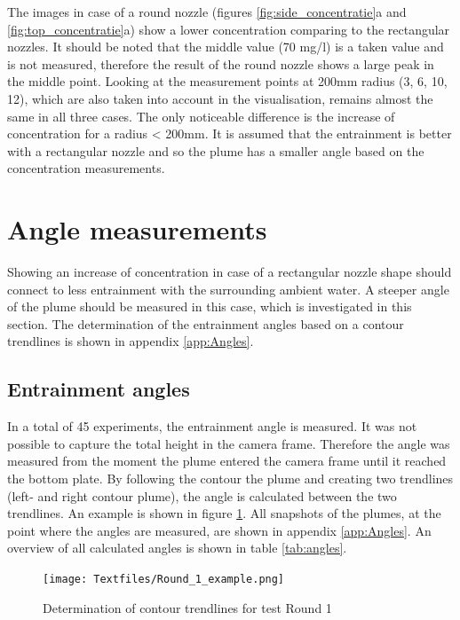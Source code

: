 \noindent The images in case of a round nozzle (figures \ref{fig:side_concentratie}a and \ref{fig:top_concentratie}a) show a lower concentration comparing to the rectangular nozzles. It should be noted that the middle value (70 mg/l) is a taken value and is not measured, therefore the result of the round nozzle shows a large peak in the middle point. Looking at the measurement points at 200mm radius (3, 6, 10, 12), which are also taken into account in the visualisation, remains almost the same in all three cases. The only noticeable difference is the increase of concentration for a radius < 200mm. It is assumed that the entrainment is better with a rectangular nozzle and so the plume has a smaller angle based on the concentration measurements.





\section{Angle measurements}
Showing an increase of concentration in case of a rectangular nozzle shape should connect to less entrainment with the surrounding ambient water. A steeper angle of the plume should be measured in this case, which is investigated in this section. The determination of the entrainment angles based on a contour trendlines is shown in appendix \ref{app:Angles}.


\subsection{Entrainment angles}
In a total of 45 experiments, the entrainment angle is measured. It was not possible to capture the total height in the camera frame. Therefore the angle was measured from the moment the plume entered the camera frame until it reached the bottom plate. By following the contour the plume and creating two trendlines (left- and right contour plume), the angle is calculated between the two trendlines. An example is shown in figure \ref{fig:example}. All snapshots of the plumes, at the point where the angles are measured, are shown in appendix \ref{app:Angles}. An overview of all calculated angles is shown in table \ref{tab:angles}.

\begin{figure}[ht!]
    \centering
    \texttt{[image: Textfiles/Round\_1\_example.png]}
    \caption{Determination of contour trendlines for test Round 1}
    \label{fig:example}
\end{figure}


